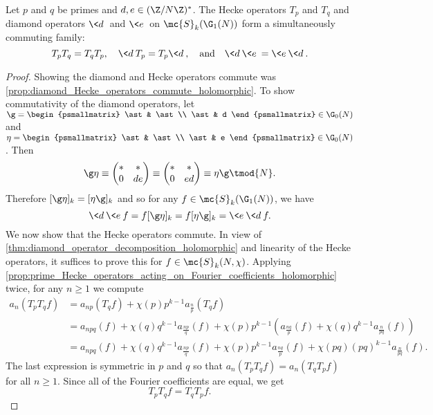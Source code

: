     \begin{proposition}\label{prop:Hecke_operators_commute_holomorphic}
      Let $p$ and $q$ be primes and $d,e \in (\Z/N\Z)^{\ast}$. The Hecke operators $T_{p}$ and $T_{q}$ and diamond operators $\<d\>$ and $\<e\>$ on $\mc{S}_{k}(\G_{1}(N))$ form a simultaneously commuting family:
      \[
        T_{p}T_{q} = T_{q}T_{p}, \quad \<d\>T_{p} = T_{p}\<d\>, \quad \text{and} \quad \<d\>\<e\> = \<e\>\<d\>.
      \]
    \end{proposition}
    \begin{proof}
      Showing the diamond and Hecke operators commute was \cref{prop:diamond_Hecke_operators_commute_holomorphic}. To show commutativity of the diamond operators, let $\g = \begin{psmallmatrix} \ast & \ast \\ \ast & d \end{psmallmatrix} \in \G_{0}(N)$  and $\eta = \begin{psmallmatrix} \ast & \ast \\ \ast & e \end{psmallmatrix} \in \G_{0}(N)$. Then
      \[
        \g\eta \equiv \begin{pmatrix} \ast & \ast \\ 0 & de \end{pmatrix} \equiv \begin{pmatrix} \ast & \ast \\ 0 & ed \end{pmatrix} \equiv \eta\g \tmod{N}.
      \]
      Therefore $[\g\eta]_{k} = [\eta\g]_{k}$ and so for any $f \in \mc{S}_{k}(\G_{1}(N))$, we have
      \[
        \<d\>\<e\>f = f[\g\eta]_{k} = f[\eta\g]_{k} = \<e\>\<d\>f.
      \]
      We now show that the Hecke operators commute. In view of \cref{thm:diamond_operator_decomposition_holomorphic} and linearity of the Hecke operators, it suffices to prove this for $f \in \mc{S}_{k}(N,\chi)$. Applying \cref{prop:prime_Hecke_operators_acting_on_Fourier_coefficients_holomorphic} twice, for any $n \ge 1$ we compute
      \begin{align*}
        a_{n}(T_{p}T_{q}f) &= a_{np}(T_{q}f)+\chi(p)p^{k-1}a_{\frac{n}{p}}(T_{q}f) \\
        &= a_{npq}(f)+\chi(q)q^{k-1}a_{\frac{np}{q}}(f)+\chi(p)p^{k-1}(a_{\frac{nq}{p}}(f)+\chi(q)q^{k-1}a_{\frac{n}{pq}}(f)) \\
        &= a_{npq}(f)+\chi(q)q^{k-1}a_{\frac{np}{q}}(f)+\chi(p)p^{k-1}a_{\frac{nq}{p}}(f)+\chi(pq)(pq)^{k-1}a_{\frac{n}{pq}}(f).
      \end{align*}
      The last expression is symmetric in $p$ and $q$ so that $a_{n}(T_{p}T_{q}f) = a_{n}(T_{q}T_{p}f)$ for all $n \ge 1$. Since all of the Fourier coefficients are equal, we get
      \[
        T_{p}T_{q}f = T_{q}T_{p}f.
      \]
    \end{proof}

